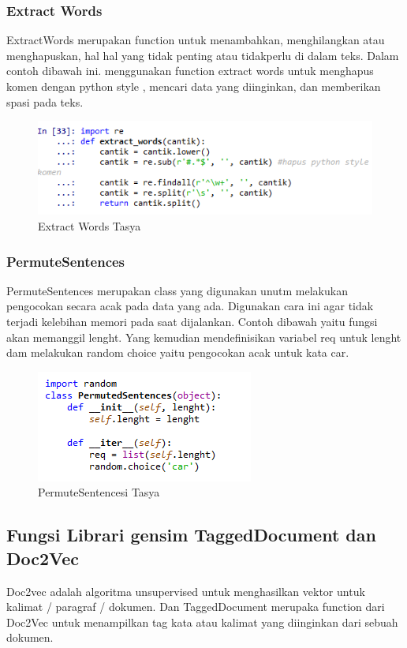 \subsubsection{Extract Words}
ExtractWords merupakan function untuk menambahkan, menghilangkan atau menghapuskan, hal hal yang tidak penting atau tidakperlu di dalam teks. Dalam contoh dibawah ini. menggunakan function extract words untuk menghapus komen dengan python style , mencari data yang diinginkan, dan memberikan spasi pada teks.
\begin{figure}[ht]
\centering
\includegraphics[scale=0.3]{figures/chapter5tasya15.png}
\caption{Extract Words Tasya}
\label{Praktek}
\end{figure}

\subsubsection{PermuteSentences}
PermuteSentences merupakan class yang digunakan unutm melakukan pengocokan secara acak pada data yang ada. Digunakan cara ini agar tidak terjadi kelebihan memori pada saat dijalankan. Contoh dibawah yaitu fungsi akan memanggil lenght. Yang kemudian mendefinisikan variabel req untuk lenght dam melakukan random choice yaitu pengocokan acak untuk kata car.
\begin{figure}[ht]
\centering
\includegraphics[scale=0.3]{figures/chapter5tasya16.png}
\caption{PermuteSentencesi Tasya}
\label{Praktek}
\end{figure}

\subsection{Fungsi Librari gensim TaggedDocument dan Doc2Vec}
Doc2vec adalah algoritma unsupervised untuk menghasilkan vektor untuk kalimat / paragraf / dokumen. Dan TaggedDocument merupaka function dari Doc2Vec untuk menampilkan tag kata atau kalimat yang diinginkan dari sebuah dokumen.

